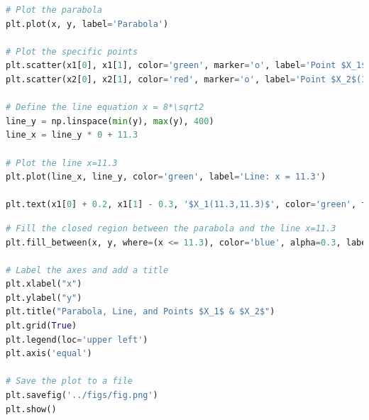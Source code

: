 \documentclass{beamer}
\theoremstyle{remark}
\numberwithin{equation}{section}
\begin{document}
\begin{frame}[fragile]
\begin{lstlisting}[language = Python]
# Plot the parabola
plt.plot(x, y, label='Parabola')

# Plot the specific points
plt.scatter(x1[0], x1[1], color='green', marker='o', label='Point $X_1$(11.3,11.3)')
plt.scatter(x2[0], x2[1], color='red', marker='o', label='Point $X_2$(11.3,-11.3)')

# Define the line equation x = 8*\sqrt2
line_y = np.linspace(min(y), max(y), 400)
line_x = line_y * 0 + 11.3

# Plot the line x=11.3
plt.plot(line_x, line_y, color='green', label='Line: x = 11.3')

plt.text(x1[0] + 0.2, x1[1] - 0.3, '$X_1(11.3,11.3)$', color='green', fontsize=9)
\end{lstlisting}
\end{frame}

\begin{frame}[fragile]
\begin{lstlisting}[language = Python]
# Fill the closed region between the parabola and the line x=11.3
plt.fill_between(x, y, where=(x <= 11.3), color='blue', alpha=0.3, label='Shaded Region')

# Label the axes and add a title
plt.xlabel("x")
plt.ylabel("y")
plt.title("Parabola, Line, and Points $X_1$ & $X_2$")
plt.grid(True)
plt.legend(loc='upper left')
plt.axis('equal')

# Save the plot to a file
plt.savefig('../figs/fig.png')
plt.show()\end{lstlisting}
\end{frame}
\end{document}
